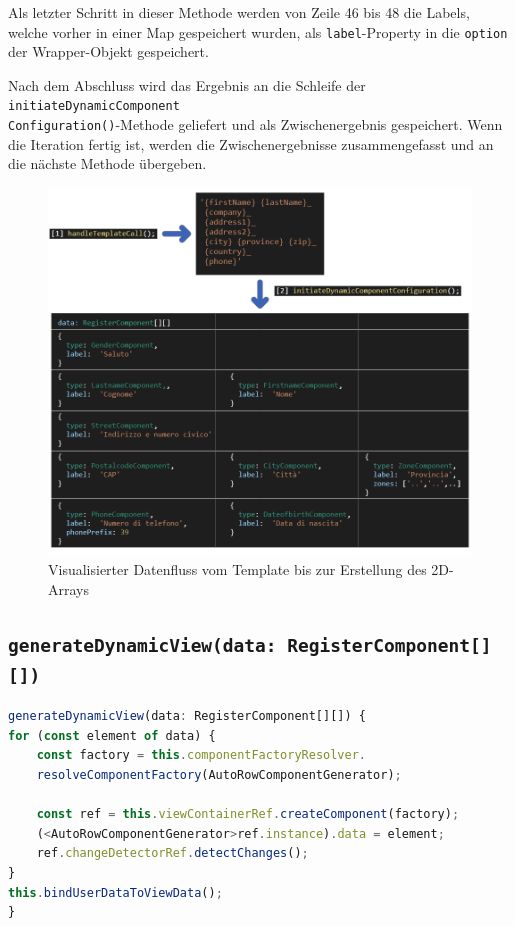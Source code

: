 Als letzter Schritt in dieser Methode werden von Zeile 46 bis 48 die Labels, welche vorher in einer Map gespeichert wurden, als \texttt{label}-Property in die \texttt{option} der Wrapper-Objekt gespeichert. 

Nach dem Abschluss wird das Ergebnis an die Schleife der \texttt{initiateDynamicComponent\\Configuration()}-Methode geliefert und als Zwischenergebnis gespeichert. Wenn die Iteration fertig ist, werden die Zwischenergebnisse zusammengefasst und an die nächste Methode übergeben.

\begin{figure}[h]
	\centerline{
		\includegraphics[width=1\textwidth, frame]{./grafiken/RF_Visualisierter Ablauf_1.png}
	}
	\vskip0pt
	\caption{Visualisierter Datenfluss vom Template bis zur Erstellung des 2D-Arrays}
\end{figure}

\subsection{\texttt{generateDynamicView(data: RegisterComponent[][])}}

\begin{lstlisting}[caption={Die \texttt{generateDynamicView()}-Methode},captionpos=b, language=JavaScript,label={lst:generateDynamicView}]
generateDynamicView(data: RegisterComponent[][]) {
for (const element of data) {
	const factory = this.componentFactoryResolver.
	resolveComponentFactory(AutoRowComponentGenerator);
	
	const ref = this.viewContainerRef.createComponent(factory);
	(<AutoRowComponentGenerator>ref.instance).data = element;
	ref.changeDetectorRef.detectChanges();
}
this.bindUserDataToViewData();
}
\end{lstlisting}

